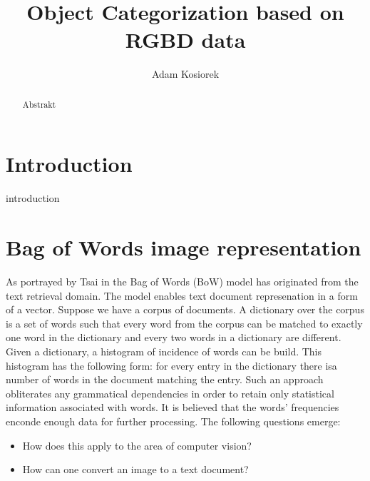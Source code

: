 \documentclass[a4paper,12pt]{article}
\title{Object Categorization based on RGBD data}
\author{Adam Kosiorek}
\begin{document}
\maketitle

\begin{abstract}

Abstrakt

\end{abstract}

%

\section{Introduction}

introduction

\section{Bag of Words image representation}

  As portrayed by Tsai in \cite{tsai2012bag} the Bag of Words (BoW) model has originated from the text retrieval domain. The model enables text document represenation in a form of a vector. Suppose we have a corpus of documents. A dictionary over the corpus is a set of words such that every word from the corpus can be matched to exactly one word in the dictionary and every two words in a dictionary are different. Given a dictionary, a histogram of incidence of words can be build. This histogram has the following form: for every entry in the dictionary there isa number of words in the document matching the entry. Such an approach obliterates any grammatical dependencies in order to retain only statistical information associated with words. It is believed that the words' frequencies enconde enough data for further processing. The following questions emerge: 
  
  \begin{itemize}
    \item How does this apply to the area of computer vision?
    \item How can one convert an image to a text document? 
  \end{itemize}
  
\end{document}
